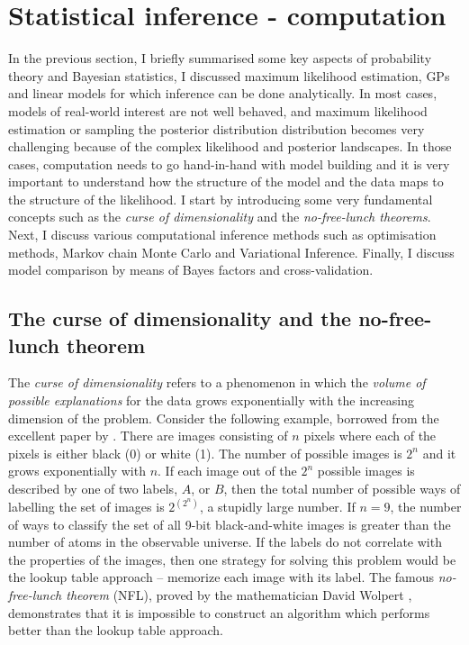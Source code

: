 \documentclass[12pt,dvipsnames]{report}
\begin{document}
\section{Statistical inference - computation}
\label{sec:inference_practice}
In the previous section, I briefly summarised some key aspects of probability theory
and Bayesian statistics, I discussed maximum likelihood estimation, 
GPs and linear models for which inference can be done analytically.
In most cases, models of real-world interest are not well behaved, and maximum
likelihood estimation or sampling the posterior distribution
distribution becomes very challenging because of the complex likelihood and posterior
landscapes. In those cases, computation needs to go hand-in-hand with model building and it
is very important to understand how the structure of the model and the data maps to the
structure of the likelihood.
I start by introducing some very fundamental
concepts such as the \emph{curse of dimensionality} and the \emph{no-free-lunch theorems}.
Next, I discuss various computational inference methods such
as optimisation methods, Markov chain Monte Carlo and Variational Inference.
Finally, I discuss model comparison by means of Bayes factors and cross-validation.

\subsection{The curse of dimensionality and the no-free-lunch theorem}
\label{ssec:nfl_theorems}
The \emph{curse of dimensionality} refers to a phenomenon in which the
\emph{volume of possible explanations} for the data grows exponentially
with the increasing dimension of the problem. Consider the following
example, borrowed from the excellent paper by \citet{arXiv:2104.00008}.
There are images consisting of $n$ pixels where each of the pixels is either
black (0) or white (1). The number of possible images is $2^n$  and it grows
exponentially with $n$. If each image out of the $2^n$ possible images is described by
one of two labels, $A$, or $B$, then the total number of possible ways of
labelling the set of images is $2^{(2^n)}$, a stupidly large number. If
$n=9$, the number of ways to classify the set of all 9-bit black-and-white
images is greater than the number of atoms in the observable universe. If the
labels do not correlate with the properties of the images, then one strategy for
solving this problem would be the lookup table approach -- memorize each image
with its label. The famous \emph{no-free-lunch theorem} (NFL), proved by the
mathematician David Wolpert \citep{wolpert1996}, demonstrates that it is
impossible to construct an algorithm which performs better than the lookup table
approach.
\end{document}
